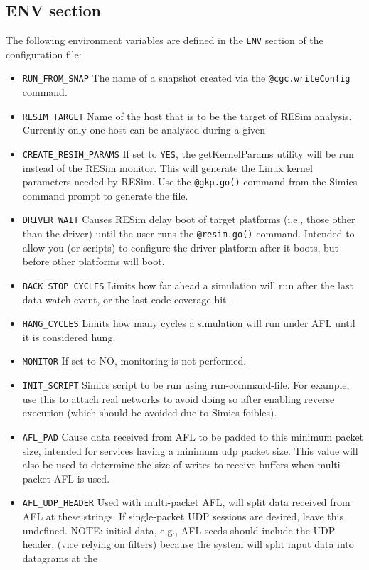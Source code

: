 \documentclass[titlepage]{article}
\begin{document}
\subsection{ENV section}
\label{env}
The following environment variables are defined in the {\tt ENV} section of the configuration file:
\begin{itemize}
\item {\tt RUN\_FROM\_SNAP} The name of a snapshot created via the {\tt @cgc.writeConfig} command.
\item {\tt RESIM\_TARGET} Name of the host that is to be the target of RESim analysis.  Currently only one host can be analyzed during a given
\item {\tt CREATE\_RESIM\_PARAMS} If set to {\tt YES}, the getKernelParams utility will be run instead of the RESim monitor.  This will
generate the Linux kernel parameters needed by RESim.  Use the {\tt @gkp.go()} command from the Simics command prompt to generate the file.
\item {\tt DRIVER\_WAIT} Causes RESim delay boot of target platforms (i.e., those other than the driver) until the 
user runs the {\tt @resim.go()} command.  Intended to allow you (or scripts)
to configure the driver platform after it boots, but before other platforms will boot.
\item {\tt BACK\_STOP\_CYCLES} Limits how far ahead a simulation will run after the last data watch event, or the last code coverage hit.
\item {\tt HANG\_CYCLES} Limits how many cycles a simulation will run under AFL until it is considered hung.
\item {\tt MONITOR} If set to NO, monitoring is not performed.
\item{\tt INIT\_SCRIPT} Simics script to be run using run-command-file.  For example, use this to attach real networks to avoid
doing so after enabling reverse execution (which should be avoided due to Simics foibles).
\item{\tt AFL\_PAD} Cause data received from AFL to be padded to this minimum packet size, intended for services having a minimum udp packet size.
This value will also be used to determine the size of writes to receive buffers when multi-packet AFL is used.
\item{\tt AFL\_UDP\_HEADER} Used with multi-packet AFL, will split data received from AFL at these strings.  If single-packet UDP sessions are desired,
leave this undefined. NOTE: initial data, e.g., AFL seeds should include the UDP header, (vice relying on filters) because the system will split input data into datagrams at the

\end{itemize}
\end{document}
